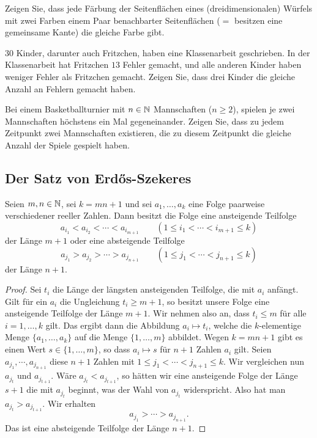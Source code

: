 \begin{aufg}
	Zeigen Sie, dass jede Färbung der Seitenflächen eines (dreidimensionalen) Würfels mit zwei Farben einem Paar benachbarter Seitenflächen ($=$ besitzen eine gemeinsame Kante) die gleiche Farbe gibt.
\end{aufg}

\begin{aufg}
	$30$ Kinder, darunter auch Fritzchen, haben eine Klassenarbeit geschrieben. In der Klassenarbeit hat Fritzchen $13$ Fehler gemacht, und alle anderen Kinder haben weniger Fehler als Fritzchen gemacht. Zeigen Sie, dass drei Kinder die gleiche Anzahl an Fehlern gemacht haben. 
\end{aufg}  

\begin{aufg}
	Bei einem Basketballturnier mit $n \in \mathbb{N}$ Mannschaften ($n \ge 2$), spielen je zwei Mannschaften höchstens ein Mal gegeneinander. Zeigen Sie, dass zu jedem Zeitpunkt zwei Mannschaften existieren, die zu diesem Zeitpunkt die gleiche Anzahl der Spiele gespielt haben. 
\end{aufg} 

\subsection{Der Satz von Erd\H{os}-Szekeres}


\begin{thm} 
	Seien $m, n \in \mathbb{N}$, sei $k=mn+1$ und sei $a_1,\ldots,a_k$ eine Folge paarweise verschiedener reeller Zahlen. Dann besitzt die Folge eine ansteigende Teilfolge 
	\[
			a_{i_1}  < a_{i_2} < \cdots < a_{i_{m+1}} \qquad (1 \le i_1 < \cdots < i_{m+1} \le k)
	\]
	der Länge $m+1$ oder eine absteigende Teilfolge 
	\[
		 a_{j_1} > a_{j_2} > \cdots > a_{j_{n+1}} \qquad (1 \le j_1 < \cdots < j_{n+1} \le k)
	\]
	der  Länge $n+1$. 
\end{thm} 
\begin{proof}
	Sei $t_i$ die Länge der längsten ansteigenden Teilfolge, die mit $a_i$ anfängt. Gilt für ein $a_i$ die Ungleichung $t_i \ge m+1$, so besitzt unsere Folge eine ansteigende Teilfolge der Länge $m+1$. Wir nehmen also an, dass $t_i \le m$ für alle $i=1,\ldots, k$ gilt. Das ergibt dann die Abbildung $a_i \mapsto t_i$, welche die $k$-elementige Menge $\{a_1,\ldots,a_k\}$ auf die Menge $\{1,\ldots,m\}$ abbildet.
	Wegen $k=mn+1$ gibt es einen Wert $s \in \{1,\ldots,m\}$, so dass $a_i \mapsto s$ für $n+1$ Zahlen $a_i$ gilt. Seien $a_{j_1}, \cdots ,  a_{j_{n+1}}$ diese $n+1$ Zahlen mit $1 \le j_1 < \cdots < j_{n+1} \le k$. Wir vergleichen nun $a_{j_t}$ und $a_{j_{t+1}}$. Wäre $a_{j_t} < a_{j_{t+1}}$, so hätten wir eine ansteigende Folge der Länge $s+1$ die mit $a_{j_t}$ beginnt, was der Wahl von $a_{j_t}$ widerspricht. Also hat man $a_{j_t} > a_{j_{t+1}}$. Wir erhalten 
	\[
		a_{j_1} > \cdots > a_{j_{n+1}}.
	\]
	Das ist eine absteigende Teilfolge der Länge $n+1$. 
\end{proof} 


